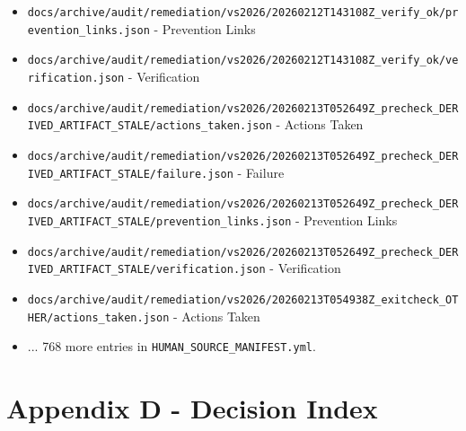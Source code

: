 \documentclass[10.5pt,a4paper,openany]{book}
\begin{document}
\begin{itemize}
\item \texttt{docs/\allowbreak{}archive/\allowbreak{}audit/\allowbreak{}remediation/\allowbreak{}vs2026/\allowbreak{}20260212T143108Z\_\allowbreak{}verify\_\allowbreak{}ok/\allowbreak{}prevention\_\allowbreak{}links.\allowbreak{}json} -\allowbreak{} Prevention Links
\item \texttt{docs/\allowbreak{}archive/\allowbreak{}audit/\allowbreak{}remediation/\allowbreak{}vs2026/\allowbreak{}20260212T143108Z\_\allowbreak{}verify\_\allowbreak{}ok/\allowbreak{}verification.\allowbreak{}json} -\allowbreak{} Verification
\item \texttt{docs/\allowbreak{}archive/\allowbreak{}audit/\allowbreak{}remediation/\allowbreak{}vs2026/\allowbreak{}20260213T052649Z\_\allowbreak{}precheck\_\allowbreak{}DERIVED\_\allowbreak{}ARTIFACT\_\allowbreak{}STALE/\allowbreak{}actions\_\allowbreak{}taken.\allowbreak{}json} -\allowbreak{} Actions Taken
\item \texttt{docs/\allowbreak{}archive/\allowbreak{}audit/\allowbreak{}remediation/\allowbreak{}vs2026/\allowbreak{}20260213T052649Z\_\allowbreak{}precheck\_\allowbreak{}DERIVED\_\allowbreak{}ARTIFACT\_\allowbreak{}STALE/\allowbreak{}failure.\allowbreak{}json} -\allowbreak{} Failure
\item \texttt{docs/\allowbreak{}archive/\allowbreak{}audit/\allowbreak{}remediation/\allowbreak{}vs2026/\allowbreak{}20260213T052649Z\_\allowbreak{}precheck\_\allowbreak{}DERIVED\_\allowbreak{}ARTIFACT\_\allowbreak{}STALE/\allowbreak{}prevention\_\allowbreak{}links.\allowbreak{}json} -\allowbreak{} Prevention Links
\item \texttt{docs/\allowbreak{}archive/\allowbreak{}audit/\allowbreak{}remediation/\allowbreak{}vs2026/\allowbreak{}20260213T052649Z\_\allowbreak{}precheck\_\allowbreak{}DERIVED\_\allowbreak{}ARTIFACT\_\allowbreak{}STALE/\allowbreak{}verification.\allowbreak{}json} -\allowbreak{} Verification
\item \texttt{docs/\allowbreak{}archive/\allowbreak{}audit/\allowbreak{}remediation/\allowbreak{}vs2026/\allowbreak{}20260213T054938Z\_\allowbreak{}exitcheck\_\allowbreak{}OTHER/\allowbreak{}actions\_\allowbreak{}taken.\allowbreak{}json} -\allowbreak{} Actions Taken
\item .\allowbreak{}.\allowbreak{}.\allowbreak{} 768 more entries in \texttt{HUMAN\_\allowbreak{}SOURCE\_\allowbreak{}MANIFEST.\allowbreak{}yml}.\allowbreak{}
\end{itemize}

\section{Appendix D - Decision Index}
\end{document}
